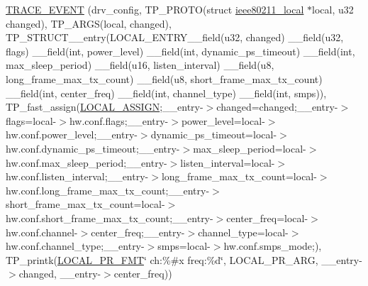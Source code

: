 \begin{DoxyCompactItemize}
\hyperlink{driver-trace_8h_a21cf637e632516dc22503ba541f561d9}{T\-R\-A\-C\-E\-\_\-\-E\-V\-E\-N\-T} (drv\-\_\-config, T\-P\-\_\-\-P\-R\-O\-T\-O(struct \hyperlink{structieee80211__local}{ieee80211\-\_\-local} $\ast$local, u32 changed), T\-P\-\_\-\-A\-R\-G\-S(local, changed), T\-P\-\_\-\-S\-T\-R\-U\-C\-T\-\_\-\-\_\-entry(L\-O\-C\-A\-L\-\_\-\-E\-N\-T\-R\-Y\-\_\-\-\_\-field(u32, changed) \-\_\-\-\_\-field(u32, flags) \-\_\-\-\_\-field(int, power\-\_\-level) \-\_\-\-\_\-field(int, dynamic\-\_\-ps\-\_\-timeout) \-\_\-\-\_\-field(int, max\-\_\-sleep\-\_\-period) \-\_\-\-\_\-field(u16, listen\-\_\-interval) \-\_\-\-\_\-field(u8, long\-\_\-frame\-\_\-max\-\_\-tx\-\_\-count) \-\_\-\-\_\-field(u8, short\-\_\-frame\-\_\-max\-\_\-tx\-\_\-count) \-\_\-\-\_\-field(int, center\-\_\-freq) \-\_\-\-\_\-field(int, channel\-\_\-type) \-\_\-\-\_\-field(int, smps)), T\-P\-\_\-fast\-\_\-assign(\hyperlink{driver-trace_8h_ab19d9141887ea92ef9640df06a51e0a1}{L\-O\-C\-A\-L\-\_\-\-A\-S\-S\-I\-G\-N};\-\_\-\-\_\-entry-\/$>$changed=changed;\-\_\-\-\_\-entry-\/$>$flags=local-\/$>$hw.\-conf.\-flags;\-\_\-\-\_\-entry-\/$>$power\-\_\-level=local-\/$>$hw.\-conf.\-power\-\_\-level;\-\_\-\-\_\-entry-\/$>$dynamic\-\_\-ps\-\_\-timeout=local-\/$>$hw.\-conf.\-dynamic\-\_\-ps\-\_\-timeout;\-\_\-\-\_\-entry-\/$>$max\-\_\-sleep\-\_\-period=local-\/$>$hw.\-conf.\-max\-\_\-sleep\-\_\-period;\-\_\-\-\_\-entry-\/$>$listen\-\_\-interval=local-\/$>$hw.\-conf.\-listen\-\_\-interval;\-\_\-\-\_\-entry-\/$>$long\-\_\-frame\-\_\-max\-\_\-tx\-\_\-count=local-\/$>$hw.\-conf.\-long\-\_\-frame\-\_\-max\-\_\-tx\-\_\-count;\-\_\-\-\_\-entry-\/$>$short\-\_\-frame\-\_\-max\-\_\-tx\-\_\-count=local-\/$>$hw.\-conf.\-short\-\_\-frame\-\_\-max\-\_\-tx\-\_\-count;\-\_\-\-\_\-entry-\/$>$center\-\_\-freq=local-\/$>$hw.\-conf.\-channel-\/$>$center\-\_\-freq;\-\_\-\-\_\-entry-\/$>$channel\-\_\-type=local-\/$>$hw.\-conf.\-channel\-\_\-type;\-\_\-\-\_\-entry-\/$>$smps=local-\/$>$hw.\-conf.\-smps\-\_\-mode;), T\-P\-\_\-printk(\hyperlink{driver-trace_8h_a09833af423135e21ffe99a59ae088cf1}{L\-O\-C\-A\-L\-\_\-\-P\-R\-\_\-\-F\-M\-T}\char`\"{} ch\-:\%\#x freq\-:\%d\char`\"{}, L\-O\-C\-A\-L\-\_\-\-P\-R\-\_\-\-A\-R\-G, \-\_\-\-\_\-entry-\/$>$changed, \-\_\-\-\_\-entry-\/$>$center\-\_\-freq))
\item 

\end{DoxyCompactItemize}
